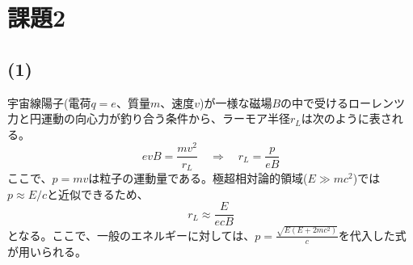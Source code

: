 \documentclass[a4paper,11pt]{jsarticle}
\begin{document}
\section*{課題2}

\subsection*{(1)}
宇宙線陽子(電荷$q = e$、質量$m$、速度$v$)が一様な磁場$B$の中で受けるローレンツ力と円運動の向心力が釣り合う条件から、ラーモア半径$r_L$は次のように表される。
\begin{equation}
    e v B = \frac{m v^2}{r_L} \quad \Longrightarrow \quad r_L = \frac{p}{e B}
\end{equation}
ここで、$p = m v$は粒子の運動量である。極超相対論的領域($E \gg m c^2$)では$p \approx E/c$と近似できるため、
\begin{equation}
    r_L \approx \frac{E}{e c B}
\end{equation}
となる。ここで、一般のエネルギーに対しては、$p = \frac{\sqrt{E(E + 2mc^2)}}{c}$を代入した式が用いられる。
\end{document}
